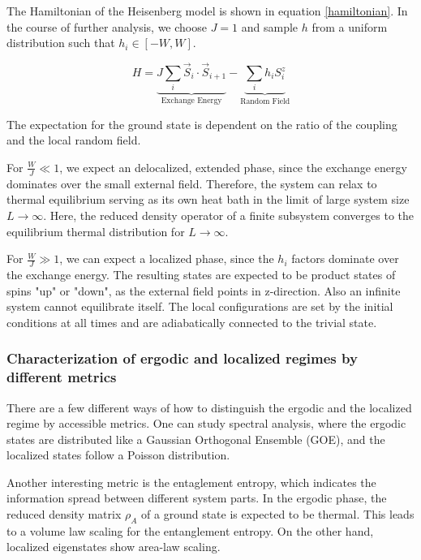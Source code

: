 \documentclass[reprint,amsmath,amssymb,aps,prb]{revtex4-2}
\begin{document}
The Hamiltonian of the Heisenberg model is shown in equation \ref{hamiltonian}. In the course of further analysis, we choose $J=1$ and sample $h$ from a uniform distribution such that $h_i \in \left[-W, W\right]$.

\begin{equation}
	H=\underbrace{J\sum_i \vec{S}_i\cdot\vec{S}_{i+1}}_{\text{Exchange Energy}}-\underbrace{\sum_ih_iS_i^z}_{\text{Random Field}}\label{hamiltonian}
\end{equation}

The expectation for the ground state is dependent on the ratio of the coupling and the local random field. 

For $\frac{W}{J} \ll 1$, we expect an delocalized, extended phase, since the exchange energy dominates over the small external field. Therefore, the system can relax to thermal equilibrium serving as its own heat bath in the limit of large system size $L\rightarrow\infty$.
Here, the reduced density operator of a finite subsystem converges to the equilibrium thermal distribution
for $L\rightarrow\infty$.\cite{Pal2010}

For $\frac{W}{J} \gg 1$, we can expect a localized phase, since the $h_i$ factors dominate over the exchange energy. The resulting states are expected to be product states of spins "up" or "down", as the external field points in z-direction. Also an infinite system cannot equilibrate itself. The local configurations are set by the initial conditions at all times and are adiabatically connected to the trivial state.\cite{Pal2010}

\subsubsection{Characterization of ergodic and localized regimes by different metrics}

There are a few different ways of how to distinguish the ergodic and the localized regime by accessible metrics. 
One can study spectral analysis, where the ergodic states are distributed like a Gaussian Orthogonal Ensemble (GOE), and the localized states follow a Poisson distribution.\cite{Laumann2014}

Another interesting metric is the entaglement entropy, which indicates the information spread between different system parts\cite{Nandkishore_2015}. In the ergodic phase, the reduced density matrix $\rho_A$ of a ground state is expected to be thermal. This leads to a volume law scaling for the entanglement entropy\cite{Altman_2015}.	On the other hand, localized eigenstates show area-law scaling\cite{yu2019bulk}.
\end{document}
